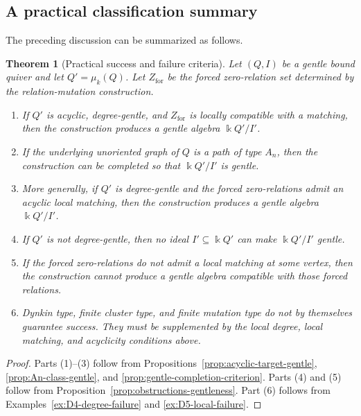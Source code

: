 \documentclass[11pt]{article}
\newcommand{\K}{\Bbbk}
\theoremstyle{plain}
\newtheorem{theorem}{Theorem}[section]
\theoremstyle{definition}
\theoremstyle{remark}
\begin{document}
\subsection{A practical classification summary}

The preceding discussion can be summarized as follows.

\begin{theorem}[Practical success and failure criteria]
\label{thm:practical-success-failure}
Let \((Q,I)\) be a gentle bound quiver and let \(Q'=\mu_k(Q)\).  Let
\(Z_{\mathrm{for}}\) be the forced zero-relation set determined by the
relation-mutation construction.

\begin{enumerate}[label=\textup{(\arabic*)},leftmargin=3em]
  \item If \(Q'\) is acyclic, degree-gentle, and \(Z_{\mathrm{for}}\) is locally
  compatible with a matching, then the construction produces a gentle algebra
  \(\K Q'/I'\).

  \item If the underlying unoriented graph of \(Q\) is a path of type \(A_n\),
  then the construction can be completed so that \(\K Q'/I'\) is gentle.

  \item More generally, if \(Q'\) is degree-gentle and the forced
  zero-relations admit an acyclic local matching, then the construction
  produces a gentle algebra \(\K Q'/I'\).

  \item If \(Q'\) is not degree-gentle, then no ideal \(I'\subseteq \K Q'\) can
  make \(\K Q'/I'\) gentle.

  \item If the forced zero-relations do not admit a local matching at some
  vertex, then the construction cannot produce a gentle algebra compatible
  with those forced relations.

  \item Dynkin type, finite cluster type, and finite mutation type do not by
  themselves guarantee success.  They must be supplemented by the local degree,
  local matching, and acyclicity conditions above.
\end{enumerate}
\end{theorem}

\begin{proof}
Parts (1)--(3) follow from Propositions~\ref{prop:acyclic-target-gentle},
\ref{prop:An-class-gentle}, and \ref{prop:gentle-completion-criterion}.  Parts
(4) and (5) follow from Proposition~\ref{prop:obstructions-gentleness}.  Part
(6) follows from Examples~\ref{ex:D4-degree-failure} and
\ref{ex:D5-local-failure}.
\end{proof}
\end{document}
